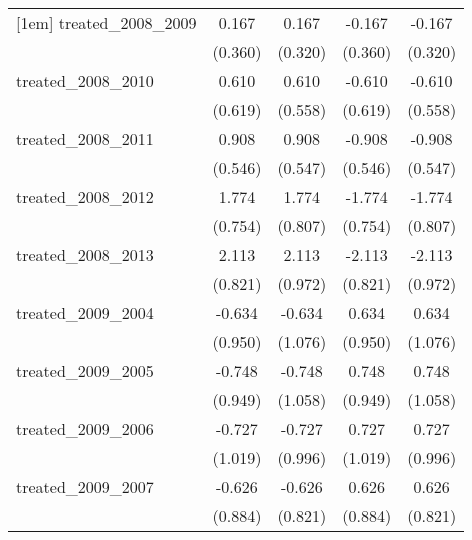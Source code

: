 {\begin{tabular}{l*{4}{c}}
[1em]
treated\_2008\_2009&       0.167         &       0.167         &      -0.167         &      -0.167         \\
            &     (0.360)         &     (0.320)         &     (0.360)         &     (0.320)         \\
[1em]
treated\_2008\_2010&       0.610         &       0.610         &      -0.610         &      -0.610         \\
            &     (0.619)         &     (0.558)         &     (0.619)         &     (0.558)         \\
[1em]
treated\_2008\_2011&       0.908         &       0.908         &      -0.908         &      -0.908         \\
            &     (0.546)         &     (0.547)         &     (0.546)         &     (0.547)         \\
[1em]
treated\_2008\_2012&       1.774\sym{*}  &       1.774\sym{*}  &      -1.774\sym{*}  &      -1.774\sym{*}  \\
            &     (0.754)         &     (0.807)         &     (0.754)         &     (0.807)         \\
[1em]
treated\_2008\_2013&       2.113\sym{*}  &       2.113\sym{*}  &      -2.113\sym{*}  &      -2.113\sym{*}  \\
            &     (0.821)         &     (0.972)         &     (0.821)         &     (0.972)         \\
[1em]
treated\_2009\_2004&      -0.634         &      -0.634         &       0.634         &       0.634         \\
            &     (0.950)         &     (1.076)         &     (0.950)         &     (1.076)         \\
[1em]
treated\_2009\_2005&      -0.748         &      -0.748         &       0.748         &       0.748         \\
            &     (0.949)         &     (1.058)         &     (0.949)         &     (1.058)         \\
[1em]
treated\_2009\_2006&      -0.727         &      -0.727         &       0.727         &       0.727         \\
            &     (1.019)         &     (0.996)         &     (1.019)         &     (0.996)         \\
[1em]
treated\_2009\_2007&      -0.626         &      -0.626         &       0.626         &       0.626         \\
            &     (0.884)         &     (0.821)         &     (0.884)         &     (0.821)         \\

\end{tabular}}
